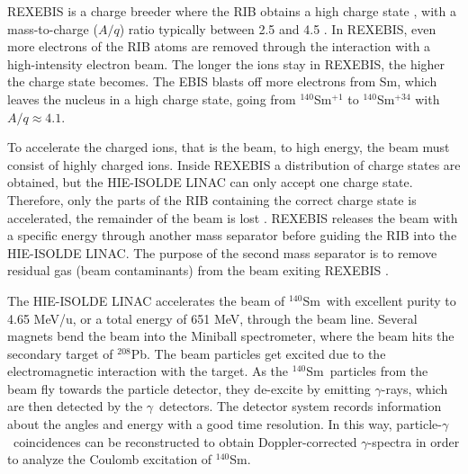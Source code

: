 \documentclass[twoside,english]{uiofysmaster/uiofysmaster}
\newcommand{\Sm}{$^{140}$Sm} %
\newcommand{\Pb}{$^{208}$Pb}
\newcommand{\ga}{$\gamma$}
\let\orgautoref\autoref
\renewcommand{\autoref}
        {%
		 \def\sectionautorefname{Section}%
		 \def\subsectionautorefname{Section}%
		 \def\subsubsectionautorefname{Section}%
		 \def\chapterautorefname{Chapter}%
          \orgautoref}
\begin{document}
REXEBIS is a charge breeder where the RIB obtains a high charge state \cite{REXEBIS}, with a mass-to-charge ($A/q$) ratio typically between 2.5 and 4.5 \cite{Post-acc}.
In REXEBIS, even more electrons of the RIB atoms are removed through the interaction with a high-intensity electron beam. 
The longer the ions stay in REXEBIS, the higher the charge state becomes. 
The EBIS blasts off more electrons from Sm, which leaves the nucleus in a high charge state, going from \Sm$^{+1}$ to \Sm$^{+34}$ with $A/q \approx 4.1$. 

To accelerate the charged ions, that is the beam, to high energy, the beam must consist of highly charged ions. 
Inside REXEBIS a distribution of charge states are obtained, but the HIE-ISOLDE LINAC can only accept one charge state.
Therefore, only the parts of the RIB containing the correct charge state is accelerated, the remainder of the beam is lost \cite{REX-web, HIE-web, EBIS2002, EBIS2010}.
REXEBIS releases the beam with a specific energy through another mass separator before guiding the RIB into the HIE-ISOLDE LINAC. 
The purpose of the second mass separator is to remove residual gas (beam contaminants) from the beam exiting REXEBIS \cite{HIE-ISOLDE}. 

The HIE-ISOLDE LINAC accelerates the beam of \Sm\ with excellent purity to 4.65 MeV/u, or a total energy of 651 MeV, through the beam line. 
Several magnets bend the beam into the Miniball spectrometer, where the beam hits the secondary target of \Pb. 
The beam particles get excited due to the electromagnetic interaction with the target.
As the \Sm\ particles from the beam fly towards the particle detector, they de-excite by emitting \ga-rays, which are then detected by the \ga\ detectors.
The detector system records information about the angles and energy with a good time resolution. 
In this way, particle-\ga\ coincidences can be reconstructed to obtain Doppler-corrected \ga-spectra  in order to analyze the Coulomb excitation of \Sm.
\end{document}
